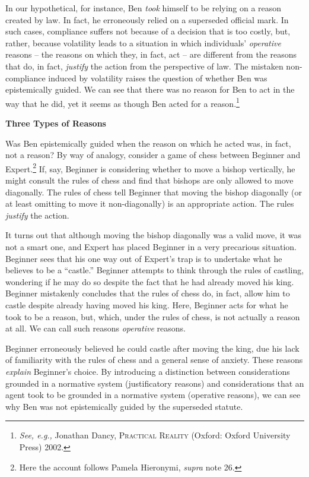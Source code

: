 In our hypothetical, for instance, Ben \emph{took} himself to be relying
on a reason created by law. In fact, he erroneously relied on a
superseded official mark. In such cases, compliance suffers not because
of a decision that is too costly, but, rather, because volatility leads
to a situation in which individuals' \emph{operative} reasons -- the
reasons on which they, in fact, act -- are different from the reasons
that do, in fact, \emph{justify} the action from the perspective of law.
The mistaken non-compliance induced by volatility raises the question of
whether Ben was epistemically guided. We can see that there was no
reason for Ben to act in the way that he did, yet it seems as though Ben
acted for a reason.\footnote{\emph{See, e.g.,} Jonathan Dancy,
  \textsc{Practical Reality} (Oxford: Oxford University Press) 2002.}

\textbf{Three Types of Reasons}

Was Ben epistemically guided when the reason on which he acted was, in
fact, not a reason? By way of analogy, consider a game of chess between
Beginner and Expert.\footnote{Here the account follows Pamela Hieronymi,
  \emph{supra} note 26.} If, say, Beginner is considering whether to
move a bishop vertically, he might consult the rules of chess and find
that bishops are only allowed to move diagonally. The rules of chess
tell Beginner that moving the bishop diagonally (or at least omitting to
move it non-diagonally) is an appropriate action. The rules
\emph{justify} the action.

It turns out that although moving the bishop diagonally was a valid
move, it was not a smart one, and Expert has placed Beginner in a very
precarious situation. Beginner sees that his one way out of Expert's
trap is to undertake what he believes to be a ``castle.'' Beginner
attempts to think through the rules of castling, wondering if he may do
so despite the fact that he had already moved his king. Beginner
mistakenly concludes that the rules of chess do, in fact, allow him to
castle despite already having moved his king. Here, Beginner acts for
what he took to be a reason, but, which, under the rules of chess, is
not actually a reason at all. We can call such reasons \emph{operative}
reasons.

Beginner erroneously believed he could castle after moving the king, due
his lack of familiarity with the rules of chess and a general sense of
anxiety. These reasons \emph{explain} Beginner's choice. By introducing
a distinction between considerations grounded in a normative system
(justificatory reasons) and considerations that an agent took to be
grounded in a normative system (operative reasons), we can see why Ben
was not epistemically guided by the superseded statute.


